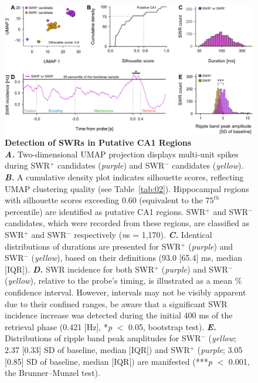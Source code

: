 \documentclass[final,3p,times,twocolumn]{elsarticle}
\begin{document}
        \clearpage
        \begin{figure}[ht]
        	\centering
            \includegraphics[width=1\textwidth]{./src/figures/.png/Figure_ID_04.png}
        	\caption{\textbf{Detection of SWRs in Putative CA1 Regions}\\
\textbf{\textit{A.}} Two-dimensional UMAP \cite{mcinnes_umap_2018} projection displays multi-unit spikes during SWR$^+$ candidates (\textit{purple}) and SWR$^-$ candidates (\textit{yellow}). \textbf{\textit{B.}} A cumulative density plot indicates silhouette scores, reflecting UMAP clustering quality (see Table~\ref{tab:02}). Hippocampal regions with silhouette scores exceeding 0.60 (equivalent to the $75^{th}$ percentile) are identified as putative CA1 regions. SWR$^+$ and SWR$^-$ candidates, which were recorded from these regions, are classified as SWR$^+$ and SWR$^-$ respectively (\textit{n}s = 1,170). \textbf{\textit{C.}} Identical distributions of durations are presented for SWR$^+$ (\textit{purple}) and SWR$^-$ (\textit{yellow}), based on their definitions (93.0 [65.4] ms, median [IQR]). \textbf{\textit{D.}} SWR incidence for both SWR$^+$ (\textit{purple}) and SWR$^-$ (\textit{yellow}), relative to the probe's timing, is illustrated as a mean \% confidence interval. However, intervals may not be visibly apparent due to their confined ranges, be aware that a significant SWR incidence increase was detected during the initial 400 ms of the retrieval phase (0.421 [Hz], *\textit{p} $<$ 0.05, bootstrap test). \textbf{\textit{E.}} Distributions of ripple band peak amplitudes for SWR$^-$ (\textit{yellow}; 2.37 [0.33] SD of baseline, median [IQR]) and SWR$^+$ (\textit{purple}; 3.05 [0.85] SD of baseline, median [IQR]) are manifested (***\textit{p} $<$ 0.001, the Brunner--Munzel test).}
        	\label{fig:04}
        \end{figure}
\end{document}
